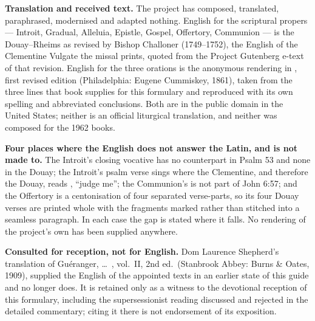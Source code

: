 \textbf{Translation and received text.} The project has composed, translated,
paraphrased, modernised and adapted nothing. English for the scriptural
propers --- Introit, Gradual, Alleluia, Epistle, Gospel, Offertory, Communion
--- is the Douay--Rheims as revised by Bishop Challoner (1749--1752), the
English of the Clementine Vulgate the missal prints, quoted from the Project
Gutenberg e-text of that revision. English for the three orations is the
anonymous rendering in , first revised edition (Philadelphia:
Eugene Cummiskey, 1861), taken from the three lines that book supplies for
this formulary and reproduced with its own spelling and abbreviated
conclusions. Both are in the public domain in the United States; neither is an
official liturgical translation, and neither was composed for the 1962 books.

\textbf{Four places where the English does not answer the Latin, and is not
made to.} The Introit's closing vocative  has no
counterpart in Psalm 53 and none in the Douay; the Introit's psalm verse sings
 where the Clementine, and therefore the Douay, reads
, ``judge me''; the Communion's  is not
part of John 6:57; and the Offertory is a centonisation of four separated
verse-parts, so its four Douay verses are printed whole with the fragments
marked rather than stitched into a seamless paragraph. In each case the gap is
stated where it falls. No rendering of the project's own has been supplied
anywhere.

\textbf{Consulted for reception, not for English.} Dom Laurence Shepherd's
translation of Guéranger,  \dots\ , vol.~II, 2nd ed.\ (Stanbrook Abbey: Burns \& Oates, 1909),
supplied the English of the appointed texts in an earlier state of this guide
and no longer does. It is retained only as a witness to the devotional
reception of this formulary, including the supersessionist reading discussed
and rejected in the detailed commentary; citing it there is not endorsement of
its exposition.

